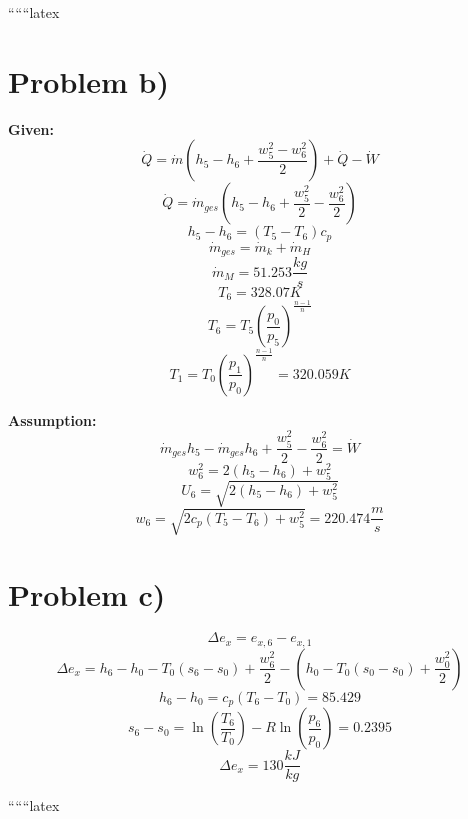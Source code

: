 ``````latex


\section*{Problem b)}

\textbf{Given:} \\
\[
\dot{Q} = \dot{m}(h_5 - h_6 + \frac{w_5^2 - w_6^2}{2}) + \dot{Q} - \dot{W}
\]
\[
\dot{Q} = \dot{m}_{ges}(h_5 - h_6 + \frac{w_5^2}{2} - \frac{w_6^2}{2})
\]
\[
h_5 - h_6 = (T_5 - T_6)c_p
\]
\[
\dot{m}_{ges} = \dot{m}_k + \dot{m}_H
\]
\[
\dot{m}_M = 51.253 \frac{kg}{s}
\]
\[
T_6 = 328.07 K
\]
\[
T_6 = T_5 \left( \frac{p_0}{p_5} \right)^{\frac{n-1}{n}}
\]
\[
T_1 = T_0 \left( \frac{p_1}{p_0} \right)^{\frac{n-1}{n}} = 320.059 K
\]

\textbf{Assumption:} \\
\[
\dot{m}_{ges} h_5 - \dot{m}_{ges} h_6 + \frac{w_5^2}{2} - \frac{w_6^2}{2} = \dot{W}
\]
\[
w_6^2 = 2(h_5 - h_6) + w_5^2
\]
\[
U_6 = \sqrt{2(h_5 - h_6) + w_5^2}
\]
\[
w_6 = \sqrt{2c_p(T_5 - T_6) + w_5^2} = 220.474 \frac{m}{s}
\]

\section*{Problem c)}

\[
\Delta e_x = e_{x,6} - e_{x,1}
\]
\[
\Delta e_x = h_6 - h_0 - T_0(s_6 - s_0) + \frac{w_6^2}{2} - \left( h_0 - T_0(s_0 - s_0) + \frac{w_0^2}{2} \right)
\]
\[
h_6 - h_0 = c_p(T_6 - T_0) = 85.429
\]
\[
s_6 - s_0 = \ln \left( \frac{T_6}{T_0} \right) - R \ln \left( \frac{p_6}{p_0} \right) = 0.2395
\]
\[
\Delta e_x = 130 \frac{kJ}{kg}
\]

``````latex


